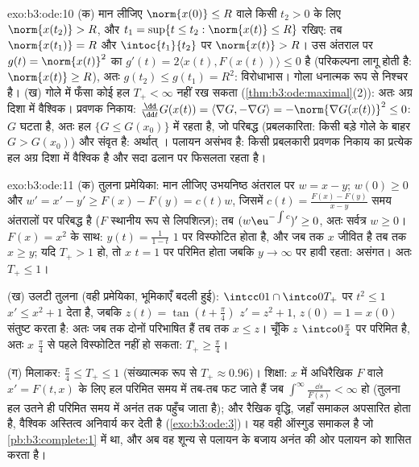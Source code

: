 \begin{solution}{exo:b3:ode:10}
(क) मान लीजिए $\norm{x(0)} \leq R$ वाले किसी $t_2 > 0$ के लिए $\norm{x(t_2)} > R$, और $t_1 = \sup\{t \leq t_2 :
\norm{x(t)} \leq R\}$ रखिए: तब
$\norm{x(t_1)} = R$ और $\intoc{t_1}{t_2}$ पर $\norm{x(t)} > R$। उस अंतराल पर $g(t) = \norm{x(t)}^2$ का $g'(t) = 2\langle x(t),
F(x(t))\rangle \leq 0$ है (परिकल्पना
लागू होती है: $\norm{x(t)}
\geq R$), अतः $g(t_2) \leq g(t_1) = R^2$: विरोधाभास। गोला धनात्मक रूप से
निश्चर है।
(ख)  गोले में फँसा कोई हल $T_+ < \infty$ नहीं रख सकता (\cref{thm:b3:ode:maximal}(2)): अतः
अग्र दिशा में वैश्विक। प्रवणक निकाय: $\frac{\dd}{\dd t}G(x(t)) =
\langle\nabla G, -\nabla G\rangle = -\norm{\nabla G(x(t))}^2
\leq 0$: $G$ घटता है, अतः हल
$\{G \leq
G(x_0)\}$ में रहता है, जो परिबद्ध (प्रबलकारिता: किसी बड़े गोले के बाहर
$G > G(x_0)$) और संवृत है: अर्थात् । पलायन असंभव है: किसी प्रबलकारी
प्रवणक निकाय का प्रत्येक हल अग्र दिशा में वैश्विक है और सदा ढलान
पर फिसलता रहता है।
\end{solution}

\begin{solution}{exo:b3:ode:11}
(क) तुलना प्रमेयिका: मान लीजिए उभयनिष्ठ अंतराल पर $w = x - y$; $w(0) \geq 0$ और
$w' = x' - y' \geq F(x) - F(y) =
c(t)w$, जिसमें $c(t) = \frac{F(x) - F(y)}{x - y}$  समय अंतरालों पर परिबद्ध है
($F$ स्थानीय रूप से लिपशित्ज़); तब $(w\eu^{-\int c})' \geq 0$, अतः सर्वत्र $w \geq 0$। $F(x) = x^2$
के साथ: $y(t) = \frac1{1 - t}$ $1$ पर विस्फोटित होता है, और जब तक $x$ जीवित है
तब तक $x
\geq y$; यदि $T_+ > 1$ हो, तो $x$ $t = 1$ पर परिमित होता जबकि $y \to \infty$
पर हावी रहता: असंगत। अतः $T_+ \leq 1$।

(ख) उलटी तुलना (वही प्रमेयिका, भूमिकाएँ बदली हुई): $\intcc01\cap\intco0{T_+}$ पर $t^2 \leq 1$
$x' \leq
x^2 + 1$ देता है, जबकि $z(t) = \tan(t + \frac\pi4)$ $z' =
z^2 + 1$, $z(0) = 1 = x(0)$ संतुष्ट करता है: अतः जब तक
दोनों परिभाषित हैं तब तक $x \leq z$। चूँकि $z$ $\intco0{\frac\pi4}$ पर परिमित है, अतः
$x$ $\frac\pi4$ से पहले विस्फोटित नहीं हो सकता: $T_+ \geq \frac\pi4$।

(ग) मिलाकर: $\frac\pi4 \leq T_+ \leq 1$ (संख्यात्मक रूप से $T_+
\approx 0.96$)। शिक्षा: $x$ में अधिरैखिक
$F$ वाले $x' = F(t, x)$ के लिए हल परिमित समय में तब-तब फट जाते हैं जब $\int^\infty\frac{\dd s}{F(s)} < \infty$
हो (तुलना हल उतने ही परिमित समय में अनंत तक पहुँच जाता है); और रैखिक
वृद्धि, जहाँ समाकल अपसारित होता है, वैश्विक अस्तित्व अनिवार्य कर
देती है (\cref{exo:b3:ode:3})। यह वही ऑस्गुड समाकल है जो \cref{pb:b3:complete:1} में था, और अब वह
शून्य से पलायन के बजाय अनंत की ओर पलायन को शासित करता है।
\end{solution}

